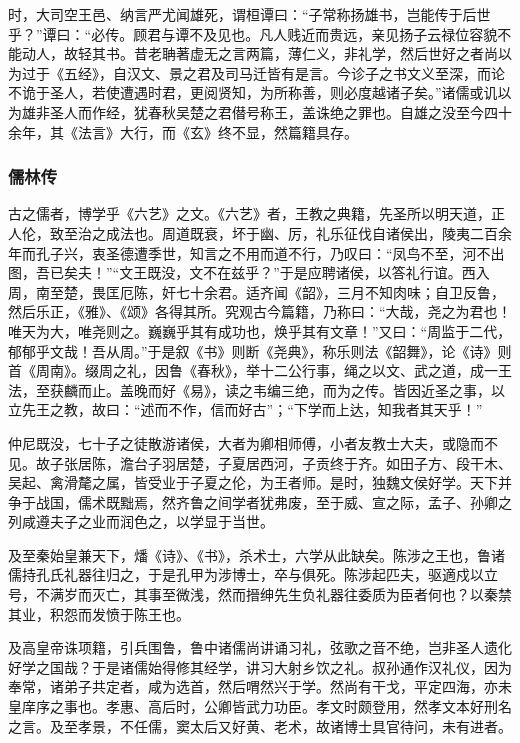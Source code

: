 \documentclass[]{article}
\begin{document}
时，大司空王邑、纳言严尤闻雄死，谓桓谭曰：``子常称扬雄书，岂能传于后世乎？''谭曰：``必传。顾君与谭不及见也。凡人贱近而贵远，亲见扬子云禄位容貌不能动人，故轻其书。昔老聃著虚无之言两篇，薄仁义，非礼学，然后世好之者尚以为过于《五经》，自汉文、景之君及司马迁皆有是言。今诊子之书文义至深，而论不诡于圣人，若使遭遇时君，更阅贤知，为所称善，则必度越诸子矣。''诸儒或讥以为雄非圣人而作经，犹春秋吴楚之君僣号称王，盖诛绝之罪也。自雄之没至今四十余年，其《法言》大行，而《玄》终不显，然篇籍具存。

\hypertarget{header-n5937}{%
\subsubsection{儒林传}\label{header-n5937}}

古之儒者，博学乎《六艺》之文。《六艺》者，王教之典籍，先圣所以明天道，正人伦，致至治之成法也。周道既衰，坏于幽、厉，礼乐征伐自诸侯出，陵夷二百余年而孔子兴，衷圣德遭季世，知言之不用而道不行，乃叹曰：``凤鸟不至，河不出图，吾已矣夫！''``文王既没，文不在兹乎？''于是应聘诸侯，以答礼行谊。西入周，南至楚，畏匡厄陈，奸七十余君。适齐闻《韶》，三月不知肉味；自卫反鲁，然后乐正，《雅》、《颂》各得其所。究观古今篇籍，乃称曰：``大哉，尧之为君也！唯天为大，唯尧则之。巍巍乎其有成功也，焕乎其有文章！''又曰：``周监于二代，郁郁乎文哉！吾从周。''于是叙《书》则断《尧典》，称乐则法《韶舞》，论《诗》则首《周南》。缀周之礼，因鲁《春秋》，举十二公行事，绳之以文、武之道，成一王法，至获麟而止。盖晚而好《易》，读之韦编三绝，而为之传。皆因近圣之事，以立先王之教，故曰：``述而不作，信而好古''；``下学而上达，知我者其天乎！''

仲尼既没，七十子之徒散游诸侯，大者为卿相师傅，小者友教士大夫，或隐而不见。故子张居陈，澹台子羽居楚，子夏居西河，子贡终于齐。如田子方、段干木、吴起、禽滑氂之属，皆受业于子夏之伦，为王者师。是时，独魏文侯好学。天下并争于战国，儒术既黜焉，然齐鲁之间学者犹弗废，至于威、宣之际，孟子、孙卿之列咸遵夫子之业而润色之，以学显于当世。

及至秦始皇兼天下，燔《诗》、《书》，杀术士，六学从此缺矣。陈涉之王也，鲁诸儒持孔氏礼器往归之，于是孔甲为涉博士，卒与俱死。陈涉起匹夫，驱適戍以立号，不满岁而灭亡，其事至微浅，然而搢绅先生负礼器往委质为臣者何也？以秦禁其业，积怨而发愤于陈王也。

及高皇帝诛项籍，引兵围鲁，鲁中诸儒尚讲诵习礼，弦歌之音不绝，岂非圣人遗化好学之国哉？于是诸儒始得修其经学，讲习大射乡饮之礼。叔孙通作汉礼仪，因为奉常，诸弟子共定者，咸为选首，然后喟然兴于学。然尚有干戈，平定四海，亦未皇庠序之事也。孝惠、高后时，公卿皆武力功臣。孝文时颇登用，然孝文本好刑名之言。及至孝景，不任儒，窦太后又好黄、老术，故诸博士具官待问，未有进者。
\end{document}
